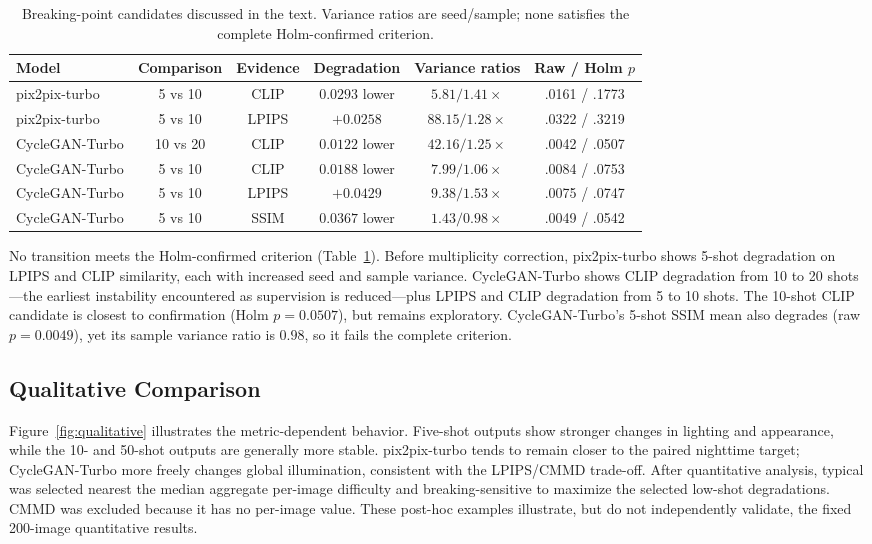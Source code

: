 \documentclass{article}
\begin{document}
\begin{table}[h]
  \caption{Breaking-point candidates discussed in the text. Variance ratios are seed/sample; none satisfies the complete Holm-confirmed criterion.}
  \label{tab:breaking}
  \centering
  \small
  \setlength{\tabcolsep}{4pt}
  \begin{tabular}{lccccc}
    \toprule
    Model & Comparison & Evidence & Degradation & Variance ratios & Raw / Holm $p$ \\
    \midrule
    pix2pix-turbo  & 5 vs 10  & CLIP  & $0.0293$ lower & $5.81/1.41\times$ & .0161 / .1773 \\
    pix2pix-turbo  & 5 vs 10  & LPIPS & $+0.0258$ & $88.15/1.28\times$ & .0322 / .3219 \\
    CycleGAN-Turbo & 10 vs 20 & CLIP  & $0.0122$ lower & $42.16/1.25\times$ & .0042 / .0507 \\
    CycleGAN-Turbo & 5 vs 10  & CLIP  & $0.0188$ lower & $7.99/1.06\times$ & .0084 / .0753 \\
    CycleGAN-Turbo & 5 vs 10  & LPIPS & $+0.0429$ & $9.38/1.53\times$ & .0075 / .0747 \\
    CycleGAN-Turbo & 5 vs 10  & SSIM  & $0.0367$ lower & $1.43/0.98\times$ & .0049 / .0542 \\
    \bottomrule
  \end{tabular}
\end{table}

No transition meets the Holm-confirmed criterion (Table~\ref{tab:breaking}). Before multiplicity correction, pix2pix-turbo shows 5-shot degradation on LPIPS and CLIP similarity, each with increased seed and sample variance. CycleGAN-Turbo shows CLIP degradation from 10 to 20 shots---the earliest instability encountered as supervision is reduced---plus LPIPS and CLIP degradation from 5 to 10 shots. The 10-shot CLIP candidate is closest to confirmation (Holm $p=0.0507$), but remains exploratory. CycleGAN-Turbo's 5-shot SSIM mean also degrades (raw $p=0.0049$), yet its sample variance ratio is $0.98$, so it fails the complete criterion.

\subsection{Qualitative Comparison}

Figure~\ref{fig:qualitative} illustrates the metric-dependent behavior. Five-shot outputs show stronger changes in lighting and appearance, while the 10- and 50-shot outputs are generally more stable. pix2pix-turbo tends to remain closer to the paired nighttime target; CycleGAN-Turbo more freely changes global illumination, consistent with the LPIPS/CMMD trade-off. After quantitative analysis, typical was selected nearest the median aggregate per-image difficulty and breaking-sensitive to maximize the selected low-shot degradations. CMMD was excluded because it has no per-image value. These post-hoc examples illustrate, but do not independently validate, the fixed 200-image quantitative results.
\end{document}
